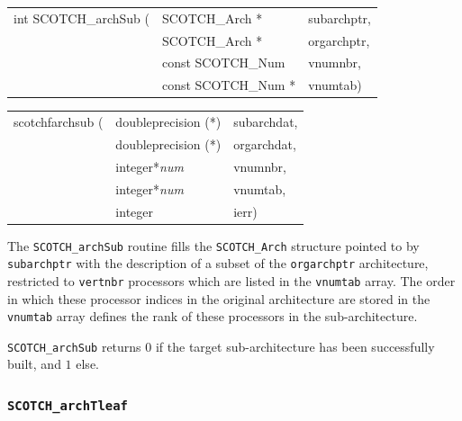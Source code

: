\begin{itemize}
\progsyn

{\tt\begin{tabular}{l@{}ll}
int SCOTCH\_archSub ( & SCOTCH\_Arch *      & subarchptr, \\
                      & SCOTCH\_Arch *      & orgarchptr, \\
                      & const SCOTCH\_Num   & vnumnbr,    \\
                      & const SCOTCH\_Num * & vnumtab)    \\
\end{tabular}}

{\tt\begin{tabular}{l@{}ll}
scotchfarchsub ( & doubleprecision (*) & subarchdat, \\
                 & doubleprecision (*) & orgarchdat, \\
                 & integer*{\it num}   & vnumnbr,    \\
                 & integer*{\it num}   & vnumtab,    \\
                 & integer             & ierr)
\end{tabular}}

\progdes

The \texttt{SCOTCH\_archSub} routine fills the
\texttt{SCOTCH\_\lbt Arch} structure pointed to by \texttt{subarchptr}
with the description of a subset of the \texttt{orgarchptr}
architecture, restricted to \texttt{vertnbr} processors which are
listed in the \texttt{vnumtab} array. The order in which these
processor indices in the original architecture are stored in the
\texttt{vnumtab} array defines the rank of these processors in the
sub-architecture.

\progret

{\tt SCOTCH\_archSub} returns $0$ if the target sub-architecture
has been successfully built, and $1$ else.
\end{itemize}

\subsubsection{{\tt SCOTCH\_archTleaf}}

